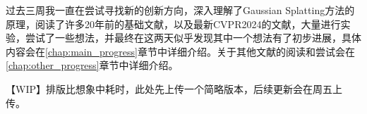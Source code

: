 过去三周我一直在尝试寻找新的创新方向，深入理解了Gaussian Splatting方法的原理，阅读了许多20年前的基础文献，以及最新CVPR2024的文献，大量进行实验，尝试了一些想法，并最终在这两天似乎发现其中一个想法有了初步进展，具体内容会在\ref{chap:main_progress}章节中详细介绍。关于其他文献的阅读和尝试会在\ref{chap:other_progress}章节中详细介绍。

【WIP】排版比想象中耗时，此处先上传一个简略版本，后续更新会在周五上传。
